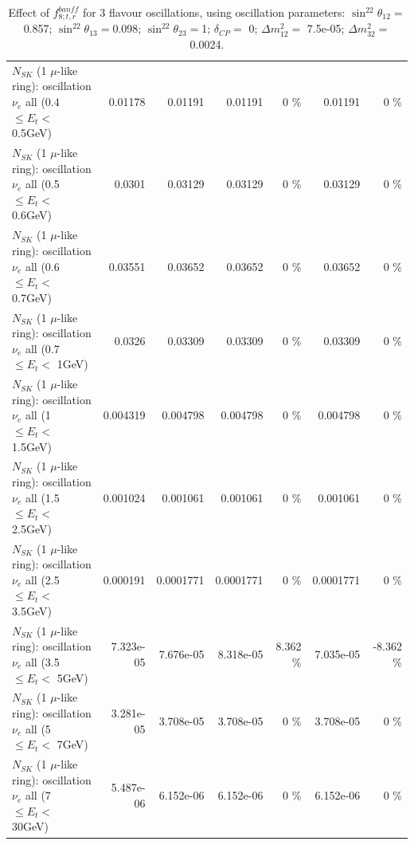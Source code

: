 \begin{table}
\begin{tabular}{| l | r | r | r  r | r  r |}
$N_{SK}$ (1 $\mu$-like ring): oscillation $\nu_{e}$ all (0.4 $\leq E_{t} <$ 0.5GeV) &         0.01178 &         0.01191 &         0.01191 &        0 \%  &         0.01191 &        0 \%  \\ 
$N_{SK}$ (1 $\mu$-like ring): oscillation $\nu_{e}$ all (0.5 $\leq E_{t} <$ 0.6GeV) &          0.0301 &         0.03129 &         0.03129 &        0 \%  &         0.03129 &        0 \%  \\ 
$N_{SK}$ (1 $\mu$-like ring): oscillation $\nu_{e}$ all (0.6 $\leq E_{t} <$ 0.7GeV) &         0.03551 &         0.03652 &         0.03652 &        0 \%  &         0.03652 &        0 \%  \\ 
$N_{SK}$ (1 $\mu$-like ring): oscillation $\nu_{e}$ all (0.7 $\leq E_{t} <$ 1GeV) &          0.0326 &         0.03309 &         0.03309 &        0 \%  &         0.03309 &        0 \%  \\ 
$N_{SK}$ (1 $\mu$-like ring): oscillation $\nu_{e}$ all (1 $\leq E_{t} <$ 1.5GeV) &        0.004319 &        0.004798 &        0.004798 &        0 \%  &        0.004798 &        0 \%  \\ 
$N_{SK}$ (1 $\mu$-like ring): oscillation $\nu_{e}$ all (1.5 $\leq E_{t} <$ 2.5GeV) &        0.001024 &        0.001061 &        0.001061 &        0 \%  &        0.001061 &        0 \%  \\ 
$N_{SK}$ (1 $\mu$-like ring): oscillation $\nu_{e}$ all (2.5 $\leq E_{t} <$ 3.5GeV) &        0.000191 &       0.0001771 &       0.0001771 &        0 \%  &       0.0001771 &        0 \%  \\ 
$N_{SK}$ (1 $\mu$-like ring): oscillation $\nu_{e}$ all (3.5 $\leq E_{t} <$ 5GeV) &       7.323e-05 &       7.676e-05 &       8.318e-05 &    8.362 \%  &       7.035e-05 &   -8.362 \%  \\ 
 $N_{SK}$ (1 $\mu$-like ring): oscillation $\nu_{e}$ all (5 $\leq E_{t} <$ 7GeV) &       3.281e-05 &       3.708e-05 &       3.708e-05 &        0 \%  &       3.708e-05 &        0 \%  \\ 
$N_{SK}$ (1 $\mu$-like ring): oscillation $\nu_{e}$ all (7 $\leq E_{t} <$ 30GeV) &       5.487e-06 &       6.152e-06 &       6.152e-06 &        0 \%  &       6.152e-06 &        0 \%  \\ 
\hline
\hline
\end{tabular}
\caption{ Effect of $f_{8; t, r}^{banff}$ for 3 flavour oscillations, using oscillation parameters:  $\sin^22\theta_{12} = $0.857; $\sin^22\theta_{13} = $0.098; $\sin^22\theta_{23} = $1; $\delta_{CP} = $        0; $\Delta m^2_{12} = $    7.5e-05; $\Delta m^2_{32} = $    0.0024. }
\label{tab:num_banff_08_1RmuT_3f_osc_t13:0.098}
\end{table}
